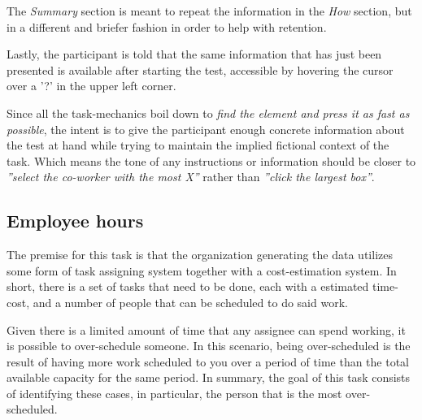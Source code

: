 \documentclass[nofilelist,dvipsnames]{cslthse-msc}
\begin{document}
{        The \textit{Summary} section is meant to repeat the information in the
        \textit{How} section, but in a different and briefer fashion in order
        to help with retention\findref.

        Lastly, the participant is told that the same information that has just
        been presented is available after starting the test, accessible by
        hovering the cursor over a '?' in the upper left corner.

        Since all the task-mechanics boil down to
        \textit{find the element and press it as fast as possible},
        the intent is to give the participant enough concrete
        information about the test at hand while trying to maintain the
        implied fictional context of the task. Which means the tone of any
        instructions or information should be closer to
        \textit{''select the co-worker with the most X''} rather than
        \textit{''click the largest box''}.


      \subsection{Employee hours}

        \textit{\ideaOne}

        The premise for this task is that the organization generating the data
        utilizes some form of task assigning system together with a
        cost-estimation system. In short, there is a set of tasks that need to
        be done, each with a estimated time-cost, and a number of people that
        can be scheduled to do said work.

        Given there is a limited amount of time that any assignee can spend
        working, it is possible to over-schedule someone. In this scenario,
        being over-scheduled is the result of having more work scheduled to you
        over a period of time than the total available capacity for the same
        period. In summary, the goal of this task consists of identifying these
        cases, in particular, the person that is the most over-scheduled.

}
\end{document}
